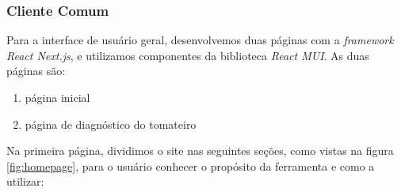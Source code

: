 \subsubsection{Cliente Comum}

Para a interface de usuário geral, desenvolvemos duas páginas com a \textit{framework} \emph{React Next.js}, e utilizamos componentes da biblioteca \emph{React MUI}. As duas páginas são:

\begin{enumerate}
    \item página inicial
    \item página de diagnóstico do tomateiro
\end{enumerate}

Na primeira página, dividimos o site nas seguintes seções, como vistas na figura \ref{fig:homepage}, para o usuário conhecer o propósito da ferramenta e como a utilizar:

